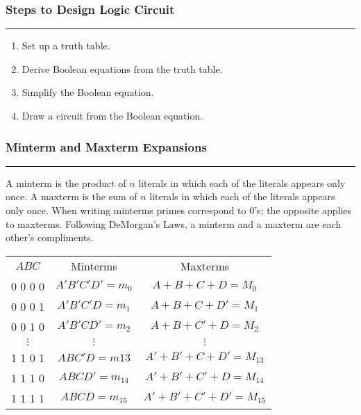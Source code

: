 \documentclass{article}
\begin{document}
    \medskip
    \subsubsection*{Steps to Design Logic Circuit}
    \vspace{-1em}
    \rule{\linewidth}{0.1mm}

    \begin{enumerate}
        \item Set up a truth table.
        \item Derive Boolean equations from the truth table.
        \item Simplify the Boolean equation.
        \item Draw a circuit from the Boolean equation.
    \end{enumerate}

    \smallskip
    \subsubsection*{Minterm and Maxterm Expansions}
    \vspace{-1em}
    \rule{\linewidth}{0.1mm}

    \smallskip\noindent
    A minterm is the product of $n$ literals in which each of the literals appears only once.
    A maxterm is the sum of $n$ literals in which each of the literals appears only once.
    When writing minterms primes correspond to 0's; the opposite applies to maxterms.
    Following DeMorgan's Laws, a minterm and a maxterm are each other's compliments.

    \begin{center}
        \begin{tabular}{c c c}
            $A B C$  & Minterms             & Maxterms                          \\
            0 0 0 0  & $A'B'C'D' = m_0$     & $A + B + C + D = M_0$             \\
            0 0 0 1  & $A'B'C'D = m_1$      & $A + B + C + D' = M_1$            \\
            0 0 1 0  & $A'B'CD' = m_2$      & $A + B + C' + D = M_2$            \\
            $\vdots$ & $\vdots$             & $\vdots$                          \\
            1 1 0 1  & $ABC'D = m{13}$      & $A' + B' + C + D' = M_{13}$       \\
            1 1 1 0  & $ABCD' = m_{14} $    & $A' + B' + C' + D = M_{14}$       \\
            1 1 1 1  & $ABCD = m_{15} $     & $A' + B' + C' + D' = M_{15}$
        \end{tabular}
    \end{center}
\end{document}
